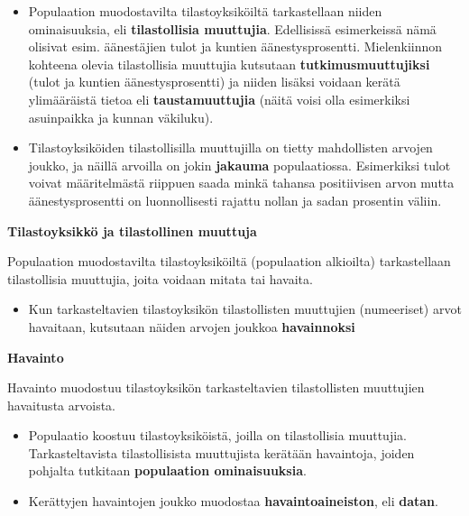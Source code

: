\documentclass[
]{book}
\providecommand{\tightlist}{%
  \setlength{\itemsep}{0pt}\setlength{\parskip}{0pt}}
\begin{document}
\begin{itemize}
\item
  Populaation muodostavilta tilastoyksiköiltä tarkastellaan niiden ominaisuuksia, eli \textbf{tilastollisia muuttujia}. Edellisissä esimerkeissä nämä olisivat esim. äänestäjien tulot ja kuntien äänestysprosentti. Mielenkiinnon kohteena olevia tilastollisia muuttujia kutsutaan \textbf{tutkimusmuuttujiksi} (tulot ja kuntien äänestysprosentti) ja niiden lisäksi voidaan kerätä ylimääräistä tietoa eli \textbf{taustamuuttujia} (näitä voisi olla esimerkiksi asuinpaikka ja kunnan väkiluku).
\item
  Tilastoyksiköiden tilastollisilla muuttujilla on tietty mahdollisten arvojen joukko, ja näillä arvoilla on jokin \textbf{jakauma} populaatiossa. Esimerkiksi tulot voivat määritelmästä riippuen saada minkä tahansa positiivisen arvon mutta äänestysprosentti on luonnollisesti rajattu nollan ja sadan prosentin väliin.
\end{itemize}

\begin{noteblock}{}
\textbf{Tilastoyksikkö ja tilastollinen muuttuja}

Populaation muodostavilta tilastoyksiköiltä (populaation alkioilta) tarkastellaan tilastollisia muuttujia, joita voidaan mitata tai havaita.

\end{noteblock}

\begin{itemize}
\tightlist
\item
  Kun tarkasteltavien tilastoyksikön tilastollisten muuttujien (numeeriset) arvot havaitaan, kutsutaan näiden arvojen joukkoa \textbf{havainnoksi}
\end{itemize}

\begin{noteblock}{}
\textbf{Havainto}

Havainto muodostuu tilastoyksikön tarkasteltavien tilastollisten muuttujien havaitusta arvoista.

\end{noteblock}

\begin{itemize}
\item
  Populaatio koostuu tilastoyksiköistä, joilla on tilastollisia muuttujia. Tarkasteltavista tilastollisista muuttujista kerätään havaintoja, joiden pohjalta tutkitaan \textbf{populaation ominaisuuksia}.
\item
  Kerättyjen havaintojen joukko muodostaa \textbf{havaintoaineiston}, eli \textbf{datan}.
\end{itemize}
\end{document}
